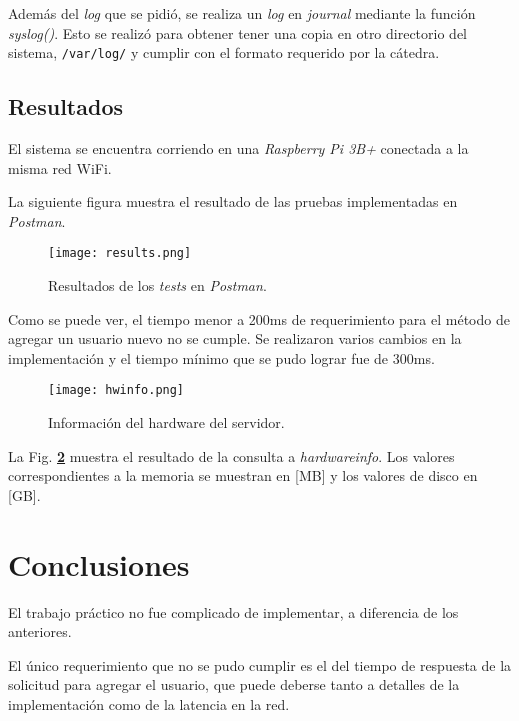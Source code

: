 \documentclass[12pt,a4paper]{article}
\begin{document}
Además del \emph{log} que se pidió, se realiza un \emph{log} en \emph{journal}
mediante la función \emph{syslog()}. Esto se realizó para obtener tener una
copia en otro directorio del sistema, \verb|/var/log/| y cumplir con el formato
requerido por la cátedra.

\subsection{Resultados}
\label{results}
El sistema se encuentra corriendo en una \emph{Raspberry Pi 3B+} conectada a la
misma red WiFi.

La siguiente figura muestra el resultado de las pruebas implementadas en
\emph{Postman}.

\begin{figure}[H]
  \centering
  \texttt{[image: results.png]}
  \caption{Resultados de los \emph{tests} en \emph{Postman}.}
  \label{postman}
\end{figure}

Como se puede ver, el tiempo menor a 200ms de requerimiento para el método de
agregar un usuario nuevo no se cumple. Se realizaron varios cambios en la
implementación y el tiempo mínimo que se pudo lograr fue de 300ms.

\begin{figure}[H]
  \centering
  \texttt{[image: hwinfo.png]}
  \caption{Información del hardware del servidor.}
  \label{raspinfo}
\end{figure}

La Fig. \textbf{\ref{raspinfo}} muestra el resultado de la consulta a
\emph{hardwareinfo}. Los valores correspondientes a la memoria se muestran en
[MB] y los valores de disco en [GB].

\section{Conclusiones}
\label{conc}
El trabajo práctico no fue complicado de implementar, a diferencia de los
anteriores.

El único requerimiento que no se pudo cumplir es el del tiempo de respuesta de
la solicitud para agregar el usuario, que puede deberse tanto a detalles de la
implementación como de la latencia en la red.
\end{document}
